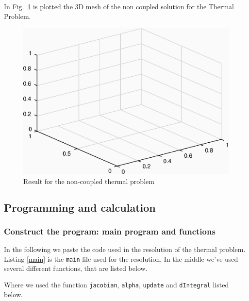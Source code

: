 In Fig.~\ref{fig:non-coupled_thermal_problem} is plotted the 3D mesh of the non coupled solution for the Thermal Problem. 
\begin{figure}[htbp]
	\centering
	\includegraphics{Matlab_Code/Temperature_result}
	\caption{Result for the non-coupled thermal problem}
	\label{fig:non-coupled_thermal_problem}
\end{figure}



\subsection{Programming and calculation}
\subsubsection{Construct the program: main program and functions}
In the following we paste the code used in the resolution of the thermal problem. 
Listing \ref{main} is the \texttt{main} file used for the resolution. In the middle we've used several different functions, that are listed below.



Where we used the function \texttt{jacobian}, \texttt{alpha}, \texttt{update} and \texttt{dIntegral} listed below.




 




